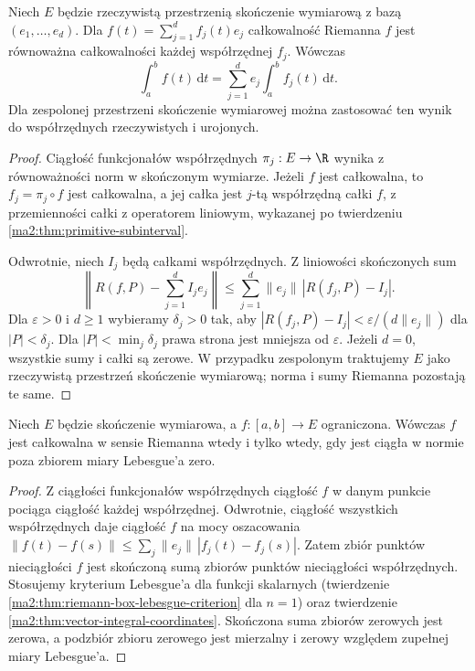\begin{twierdzenie}
\label{ma2:thm:vector-integral-coordinates}
Niech $E$ będzie rzeczywistą przestrzenią
skończenie wymiarową z bazą $(e_1,\ldots,e_d)$.
Dla $f(t)=\sum_{j=1}^d f_j(t)e_j$
całkowalność Riemanna $f$ jest równoważna
całkowalności każdej współrzędnej $f_j$.
Wówczas
\[
 \int_a^b f(t)\,\mathrm dt
 =\sum_{j=1}^d e_j\int_a^b f_j(t)\,\mathrm dt.
\]
Dla zespolonej przestrzeni skończenie wymiarowej
można zastosować ten wynik do współrzędnych
rzeczywistych i urojonych.
\end{twierdzenie}
\begin{proof}
Ciągłość funkcjonałów współrzędnych $\pi_j:E\to\R$
wynika z równoważności norm w skończonym wymiarze.
Jeżeli $f$ jest całkowalna, to $f_j=\pi_j\circ f$
jest całkowalna, a jej całka jest $j$-tą
współrzędną całki $f$, z przemienności całki
z operatorem liniowym, wykazanej po twierdzeniu
\ref{ma2:thm:primitive-subinterval}.

Odwrotnie, niech $I_j$ będą całkami współrzędnych.
Z liniowości skończonych sum
\[
 \left\|R(f,P)-\sum_{j=1}^d I_je_j\right\|
 \le\sum_{j=1}^d\|e_j\|\,|R(f_j,P)-I_j|.
\]
Dla $\varepsilon>0$ i $d\ge1$ wybieramy
$\delta_j>0$ tak, aby
$|R(f_j,P)-I_j|<\varepsilon/(d\|e_j\|)$
dla $|P|<\delta_j$. Dla
$|P|<\min_j\delta_j$ prawa strona jest
mniejsza od $\varepsilon$.
Jeżeli $d=0$, wszystkie sumy i całki są zerowe.
W przypadku zespolonym traktujemy $E$
jako rzeczywistą przestrzeń skończenie wymiarową;
norma i sumy Riemanna pozostają te same.
\end{proof}

\begin{wniosek}
\label{ma2:cor:vector-integral-lebesgue-finite}
Niech $E$ będzie skończenie wymiarowa,
a $f:[a,b]\to E$ ograniczona.
Wówczas $f$ jest całkowalna w sensie Riemanna
wtedy i tylko wtedy, gdy jest ciągła w normie
poza zbiorem miary Lebesgue'a zero.
\end{wniosek}
\begin{proof}
Z ciągłości funkcjonałów współrzędnych
ciągłość $f$ w danym punkcie pociąga
ciągłość każdej współrzędnej. Odwrotnie,
ciągłość wszystkich współrzędnych daje
ciągłość $f$ na mocy oszacowania
$\|f(t)-f(s)\|\le\sum_j\|e_j\|\,|f_j(t)-f_j(s)|$.
Zatem zbiór punktów nieciągłości $f$
jest skończoną sumą zbiorów punktów
nieciągłości współrzędnych.
Stosujemy kryterium Lebesgue'a dla funkcji
skalarnych (twierdzenie
\ref{ma2:thm:riemann-box-lebesgue-criterion}
dla $n=1$) oraz twierdzenie
\ref{ma2:thm:vector-integral-coordinates}.
Skończona suma zbiorów zerowych jest zerowa,
a podzbiór zbioru zerowego jest mierzalny
i zerowy względem zupełnej miary Lebesgue'a.
\end{proof}


